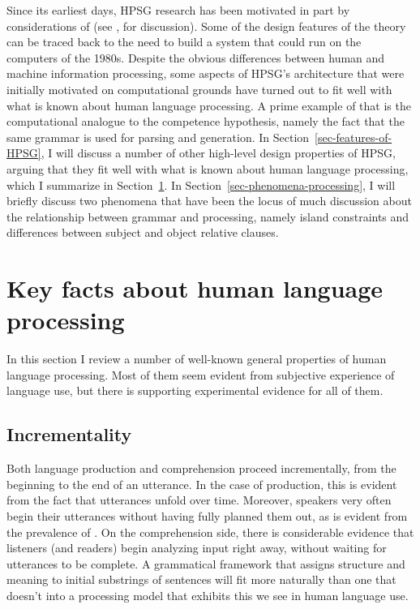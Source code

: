 \documentclass[output=paper
	        ,collection
	        ,collectionchapter
 	        ,biblatex
                ,babelshorthands
                ,newtxmath
                ,draftmode
                ,colorlinks, citecolor=brown
]{langscibook}
\begin{document}
Since its earliest days, HPSG research has been motivated in part by considerations of  (see , for discussion).  Some of the design features of the theory can be traced back to the need to build a system that could run on the computers of the 1980s.  Despite the obvious differences between human and machine information processing, some aspects of HPSG's architecture that were initially motivated on computational grounds have turned out to fit well with what is known about human language processing.  A prime example of that is the computational analogue to the competence hypothesis, namely the fact that the same grammar is used for parsing and generation. In Section~\ref{sec-features-of-HPSG}, I will discuss a number of other high-level design properties of HPSG, arguing that they fit well with what is known about human language processing, which I summarize in Section~\ref{sec-key-facts}.  In Section~\ref{sec-phenomena-processing}, I will briefly discuss two phenomena that have been the locus of much discussion about the relationship between grammar and processing, namely island constraints and differences between subject and object relative clauses.

\section{Key facts about human language processing}
\label{sec-key-facts}

In this section I review a number of well-known general properties of human language processing.  Most of them seem evident from subjective experience of language use, but there is supporting experimental evidence for all of them.  

\subsection{Incrementality}

Both language production and comprehension proceed incrementally, from the beginning to the end of an utterance.  In the case of production, this is evident from the fact that utterances unfold over time.  Moreover, speakers very often begin their utterances without having fully planned them out, as is evident from the prevalence of .  On the comprehension side, there is considerable evidence that listeners (and readers) begin analyzing input right away, without waiting for utterances to be complete.  A grammatical framework that assigns structure and meaning to initial substrings of sentences will fit more naturally than one that doesn't into a processing model that exhibits this  we see in human language use.  
\end{document}

